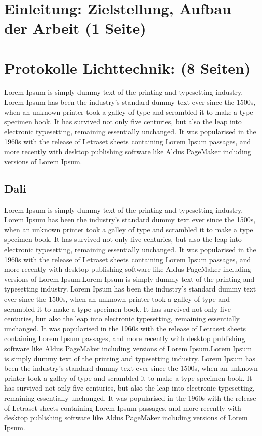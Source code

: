 

\chapter{Einleitung: Zielstellung, Aufbau der Arbeit (1 Seite)}
\label{ChapterX} %


\chapter{Protokolle Lichttechnik: (8 Seiten)}
Lorem Ipsum is simply dummy text of the printing and typesetting industry. Lorem Ipsum has been the industry's standard dummy text ever since the 1500s, when an unknown printer took a galley of type and scrambled it to make a type specimen book. It has survived not only five centuries, but also the leap into electronic typesetting, remaining essentially unchanged. It was popularised in the 1960s with the release of Letraset sheets containing Lorem Ipsum passages, and more recently with desktop publishing software like Aldus PageMaker including versions of Lorem Ipsum.

\section{Dali}
Lorem Ipsum is simply dummy text of the printing and typesetting industry. Lorem Ipsum has been the industry's standard dummy text ever since the 1500s, when an unknown printer took a galley of type and scrambled it to make a type specimen book. It has survived not only five centuries, but also the leap into electronic typesetting, remaining essentially unchanged. It was popularised in the 1960s with the release of Letraset sheets containing Lorem Ipsum passages, and more recently with desktop publishing software like Aldus PageMaker including versions of Lorem Ipsum.Lorem Ipsum is simply dummy text of the printing and typesetting industry. Lorem Ipsum has been the industry's standard dummy text ever since the 1500s, when an unknown printer took a galley of type and scrambled it to make a type specimen book. It has survived not only five centuries, but also the leap into electronic typesetting, remaining essentially unchanged. It was popularised in the 1960s with the release of Letraset sheets containing Lorem Ipsum passages, and more recently with desktop publishing software like Aldus PageMaker including versions of Lorem Ipsum.Lorem Ipsum is simply dummy text of the printing and typesetting industry. Lorem Ipsum has been the industry's standard dummy text ever since the 1500s, when an unknown printer took a galley of type and scrambled it to make a type specimen book. It has survived not only five centuries, but also the leap into electronic typesetting, remaining essentially unchanged. It was popularised in the 1960s with the release of Letraset sheets containing Lorem Ipsum passages, and more recently with desktop publishing software like Aldus PageMaker including versions of Lorem Ipsum.

